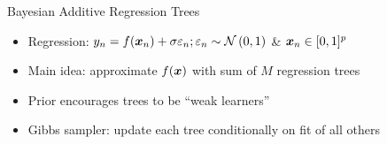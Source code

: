 \documentclass[aspectratio=199]{beamer}
\begin{document}
\begin{frame}{Bayesian Additive Regression Trees}
\begin{itemize}
\item{Regression: $y_{n} = f(\bm{x}_{n}) + \sigma \varepsilon_{n}; \varepsilon_{n} \sim \mathcal{N}\left(0,1\right)$ \& $\bm{x}_{n} \in [0,1]^{p}$}
\item{Main idea: approximate $f(\bm{x})$ with sum of $M$ regression trees} 
\item{Prior encourages trees to be ``weak learners''}
\item{Gibbs sampler: update each tree conditionally on fit of all others}

\end{itemize}

\begin{columns}


\end{columns}
\end{frame}
\end{document}
